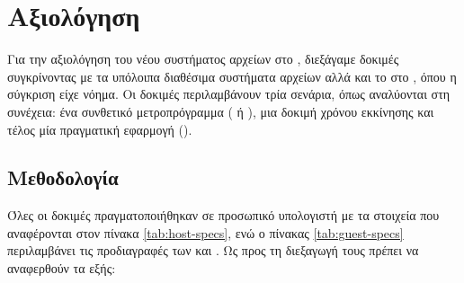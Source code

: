 \chapter{Αξιολόγηση}

Για την αξιολόγηση του νέου συστήματος αρχείων στο \osv{}, διεξάγαμε δοκιμές
συγκρίνοντας με τα υπόλοιπα διαθέσιμα συστήματα αρχείων αλλά και το
\viofs{} στο \linux{}, όπου η σύγκριση είχε νόημα. Οι δοκιμές περιλαμβάνουν
τρία σενάρια, όπως αναλύονται στη συνέχεια: ένα συνθετικό μετροπρόγραμμα
( ή ), μια δοκιμή χρόνου εκκίνησης
και τέλος μία πραγματική εφαρμογή ().

\section{Μεθοδολογία}
Όλες οι δοκιμές πραγματοποιήθηκαν σε προσωπικό υπολογιστή με τα στοιχεία που
αναφέρονται στον πίνακα \ref{tab:host-specs}, ενώ ο πίνακας
\ref{tab:guest-specs} περιλαμβάνει τις προδιαγραφές των \osv{} και \linux{}
. Ως προς τη διεξαγωγή τους πρέπει να αναφερθούν τα εξής:
